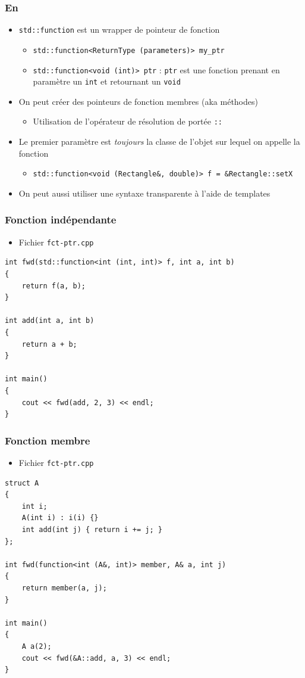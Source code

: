 \begin{frame}
\frametitle{En \cpp}
\begin{itemize}[<+->]
\item \texttt{std::function} est un wrapper de pointeur de fonction
	\begin{itemize}
	\item \texttt{std::function<ReturnType (parameters)> my\_ptr}
	\item \lstinline|std::function<void (int)> ptr| : \texttt{ptr} est une fonction prenant en paramètre un \lstinline|int| et retournant un \lstinline|void|
	\end{itemize}
\item On peut créer des pointeurs de fonction membres (aka méthodes)
	\begin{itemize}
	\item Utilisation de l'opérateur de résolution de portée \texttt{::}
	\end{itemize}
\item Le premier paramètre est \emph{toujours} la classe de l'objet sur lequel on appelle la fonction
	\begin{itemize}
	\item \tiny{\lstinline|std::function<void (Rectangle&, double)> f = &Rectangle::setX|}
	\end{itemize}
\item On peut aussi utiliser une syntaxe transparente à l'aide de templates
\end{itemize}
\end{frame}

\begin{frame}[containsverbatim]
\frametitle{Fonction indépendante}
\begin{itemize}
\item Fichier \texttt{fct-ptr.cpp}
\end{itemize}
\begin{lstlisting}
int fwd(std::function<int (int, int)> f, int a, int b)
{
	return f(a, b);
}

int add(int a, int b)
{
	return a + b;
}

int main()
{
	cout << fwd(add, 2, 3) << endl;
}
\end{lstlisting}
\end{frame}

\begin{frame}[containsverbatim]
\frametitle{Fonction membre}
\begin{itemize}
\item Fichier \texttt{fct-ptr.cpp}
\end{itemize}
\begin{lstlisting}
struct A
{
	int i;
	A(int i) : i(i) {}
	int add(int j) { return i += j; }
};

int fwd(function<int (A&, int)> member, A& a, int j)
{
	return member(a, j);
}

int main()
{	
	A a(2);
	cout << fwd(&A::add, a, 3) << endl;
}
\end{lstlisting}
\end{frame}

